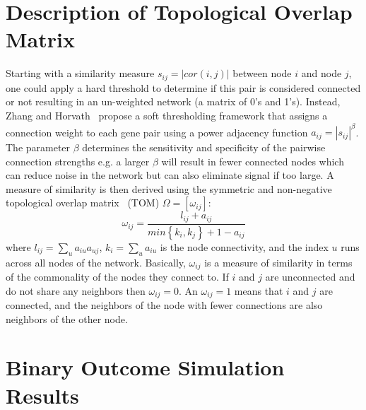 \section{Description of Topological Overlap Matrix} \label{ap:tomdefinition}

Starting with a similarity measure $s_{ij}=|cor(i,j)|$ between node $i$ and node $j$, one could apply a hard threshold to determine if this pair is considered connected or not resulting in an un-weighted network (a matrix of 0's and 1's). Instead, Zhang and Horvath~\citep{zhang2005general} propose a soft thresholding framework that assigns a connection weight to each gene pair using a power adjacency function $a_{ij} = |s_{ij}|^{\beta}$. The parameter $\beta$ determines the sensitivity and specificity of the pairwise connection strengths e.g. a larger $\beta$ will result in fewer connected nodes which can reduce noise in the network but can also eliminate signal if too large. A measure of similarity is then derived using the symmetric and non-negative topological overlap matrix~\citep{ravasz2002hierarchical} (TOM) $\Omega = [\omega_{ij}]$:
\begin{equation}
\omega_{ij} = \frac{l_{ij} + a_{ij}}{min\left\lbrace k_i, k_j \right\rbrace + 1-a_{ij} }  \label{eq:TOM}
\end{equation}
where $l_{ij} = \sum_u a_{iu}a_{uj}$, $k_i = \sum_u a_{iu}$ is the node connectivity, and the index $u$ runs across all nodes of the network. Basically, $\omega_{ij}$ is a measure of similarity in terms of the commonality of the nodes they connect to. If $i$ and $j$ are unconnected and do not share any neighbors then $\omega_{ij}=0$. An $\omega_{ij}=1$ means that $i$ and $j$ are connected, and the neighbors of the node with fewer connections are also neighbors of the other node. 


\section{Binary Outcome Simulation Results}\label{ap:binaryoutcome}

